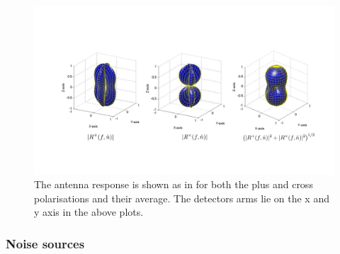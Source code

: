 \begin{figure}
    \centering
    \includegraphics[width=\textwidth]{C1_intro/LIGO_beam_patterns.png}
    \caption[Antenna response of the \gls{LIGO} detectors.]{The antenna response is shown as in \citep{romano2019SearchesStochastic} for both the plus and cross polarisations and their average. The detectors arms lie on the x and y axis in the above plots. }
    \label{intro:detectors:response}
\end{figure}

\subsubsection{\label{intro:detector:noise}Noise sources}

